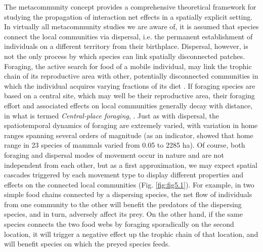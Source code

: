 The metacommunity concept \citep{Leibold2018} provides a comprehensive theoretical framework for studying the propagation of interaction net effects in a spatially explicit setting. In virtually all metacommunity studies we are aware of, it is assumed that species connect the local communities via dispersal, i.e. the permanent establishment of individuals on a different territory from their birthplace. Dispersal, however, is not the only process by which species can link spatially disconnected patches. Foraging, the active search for food of a mobile individual, may link the trophic chain of its reproductive area with other, potentially disconnected communities in which the individual acquires varying fractions of its diet \citep{McCann2005}. If foraging species are based on a central site, which may well be their reproductive area, their foraging effort and associated effects on local communities generally decay with distance, in what is termed \textit{Central-place foraging}, \citep{Orians1979}. Just as with dispersal, the spatiotemporal dynamics of foraging are extremely varied, with variation in home ranges spanning several orders of magnitude (as an indicator, \citealt{Swihart1988} showed that home range in 23 species of mammals varied from 0.05 to 2285 ha). Of course, both foraging and dispersal modes of movement occur in nature and are not independent from each other, but as a first approximation, we may expect spatial cascades triggered by each movement type to display different properties and effects on the connected local communities (Fig. \ref{fig:fig5.1}). For example, in two simple food chains connected by a dispersing species, the net flow of individuals from one community to the other will benefit the predators of the dispersing species, and in turn, adversely affect its prey. On the other hand, if the same species connects the two food webs by foraging sporadically on the second location, it will trigger a negative effect up the trophic chain of that location, and will benefit species on which the preyed species feeds.

